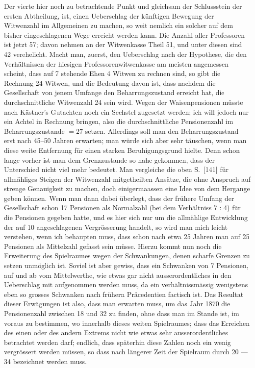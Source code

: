 \documentclass[12pt,a4paper]{article}
\begin{document}
Der vierte hier noch zu betrachtende Punkt und gleichsam der Schlussstein der ersten Abtheilung, ist, einen Ueberschlag der k\"unftigen Bewegung der Witwenzahl im Allgemeinen zu machen, so weit nemlich ein solcher auf dem bisher eingeschlagenen Wege erreicht werden kann. Die Anzahl aller Professoren ist jetzt 57; davon nehmen an der Witwenkasse Theil 51, und unter diesen sind 42 verehelicht. Macht man, zuerst, den Ueberschlag nach der Hypothese, die den Verh\"altnissen der hiesigen Professorenwitwenkasse am meisten angemessen scheint, dass auf 7 stehende Ehen 4 Witwen zu rechnen sind, so gibt die Rechnung 24 Witwen, und die Bedeutung davon ist, dass nachdem die Gesellschaft von jenem Umfange den Beharrungszustand erreicht hat, die durchschnittliche Witwenzahl 24 sein wird. Wegen der Waisenpensionen m\"usste nach K\"astner's Gutachten noch ein Sechstel zugesetzt werden; ich will jedoch nur ein Achtel in Rechnung bringen, also die durchschnittliche Pensionenzahl im Beharrungszustande $= 27$ setzen. Allerdings soll man den Beharrungszustand erst nach 45--50 Jahren erwarten; man w\"urde sich aber sehr t\"auschen, wenn man diese weite Entfernung f\"ur einen starken Beruhigungsgrund hielte. Denn schon lange vorher ist man dem Grenzzustande so nahe gekommen, dass der Unterschied nicht viel mehr bedeutet. Man vergleiche die oben S.\ [141] f\"ur allm\"ahliges Steigen der Witwenzahl mitgetheilten Ans\"atze, die ohne Anspruch auf strenge Genauigkeit zu machen, doch einigermaassen eine Idee von dem Hergange geben k\"onnen. Wenn man dann dabei \"uberlegt, dass der fr\"uhere Umfang der Gesellschaft schon 17 Pensionen als Normalzahl (bei dem Verh\"altniss 7 : 4) f\"ur die Pensionen gegeben hatte, und es hier sich nur um die allm\"ahlige Entwicklung der auf 10 angeschlagenen Vergr\"osserung handelt, so wird man mich leicht verstehen, wenn ich behaupten muss, dass schon nach etwa 25 Jahren man auf 25 Pensionen als Mittelzahl gefasst sein m\"usse. Hierzu kommt nun noch die Erweiterung des Spielraumes wegen der Schwankungen, denen scharfe Grenzen zu setzen unm\"oglich ist. Soviel ist aber gewiss, dass ein Schwanken von 7 Pensionen, auf und ab vom Mittelwerthe, wie etwas gar nicht ausserordentliches in den Ueberschlag mit aufgenommen werden muss, da ein verh\"altnissm\"assig wenigstens eben so grosses Schwanken nach fr\"uhern Pr\"acedentien factisch ist. Das Resultat dieser Erw\"agungen ist also, dass man erwarten muss, um das Jahr 1870 die Pensionenzahl zwischen 18 und 32 zu finden, ohne dass man im Stande ist, im voraus zu bestimmen, wo innerhalb dieses weiten Spielraumes; dass das Erreichen des einen oder des andern Extrems nicht wie etwas sehr ausserordentliches betrachtet werden darf; endlich, dass sp\"aterhin diese Zahlen noch ein wenig vergr\"ossert werden m\"ussen, so dass nach l\"angerer Zeit der Spielraum durch 20 --- 34 bezeichnet werden muss.
\end{document}
